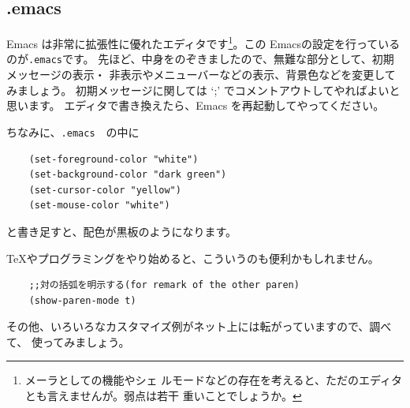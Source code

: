 \documentclass[a4j]{ltjreport}
\begin{document}





    \subsection{.emacs}
    Emacs は非常に拡張性に優れたエディタです\footnote{メーラとしての機能やシェ
    ルモードなどの存在を考えると、ただのエディタとも言えませんが。弱点は若干
    重いことでしょうか。}。この Emacsの設定を行っているのが\verb+.emacs+です。
    先ほど、中身をのぞきましたので、無難な部分として、初期メッセージの表示・
    非表示やメニューバーなどの表示、背景色などを変更してみましょう。
    初期メッセージに関しては `;' でコメントアウトしてやればよいと思います。
    エディタで書き換えたら、Emacs を再起動してやってください。

    ちなみに、\verb+.emacs+　の中に
    \begin{verbatim}
    (set-foreground-color "white")
    (set-background-color "dark green")
    (set-cursor-color "yellow")
    (set-mouse-color "white")
    \end{verbatim}
    と書き足すと、配色が黒板のようになります。

    \TeX やプログラミングをやり始めると、こういうのも便利かもしれません。
    \begin{verbatim}
    ;;対の括弧を明示する(for remark of the other paren)
    (show-paren-mode t)
    \end{verbatim}

    その他、いろいろなカスタマイズ例がネット上には転がっていますので、調べて、
    使ってみましょう。
\end{document}
